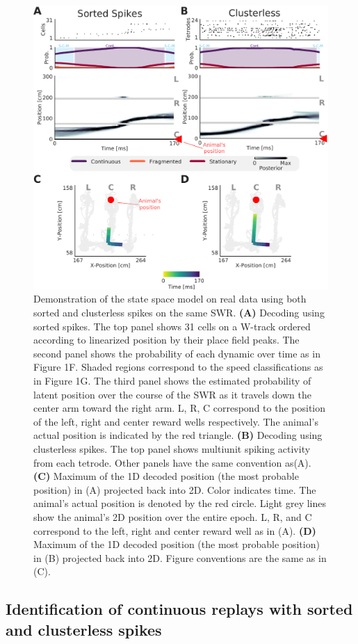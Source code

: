 \documentclass[times, twoside]{zHenriquesLab-StyleBioRxiv}
\begin{document}
\begin{figure}%
\centering
\includegraphics[width=0.80\linewidth]{figures/Figure2/Figure2_v4}
\caption{Demonstration of the state space model on real data using both sorted and clusterless spikes on the same SWR. \textbf{(A)} Decoding using sorted spikes. The top panel shows 31 cells on a W-track ordered according to linearized position by their place field peaks. The second panel shows the probability of each dynamic over time as in Figure 1F. Shaded regions correspond to the speed classifications as in Figure 1G. The third panel shows the estimated probability of latent position over the course of the SWR as it travels down the center arm toward the right arm. L, R, C correspond to the position of the left, right and center reward wells respectively. The animal's actual position is indicated by the red triangle. \textbf{(B)} Decoding using clusterless spikes. The top panel shows multiunit spiking activity from each tetrode. Other panels have the same convention as(A).  \textbf{(C)} Maximum of the 1D decoded position (the most probable position) in (A) projected back into 2D. Color indicates time. The animal's actual position is denoted by the red circle. Light grey lines show the animal's 2D position over the entire epoch. L, R, and C correspond to the left, right and center reward well as in (A). \textbf{(D)} Maximum of the 1D decoded position (the most probable position) in (B) projected back into 2D. Figure conventions are the same as in (C).
}
\label{2}
\end{figure}
\subsection*{Identification of continuous replays with sorted and clusterless spikes}
\end{document}

